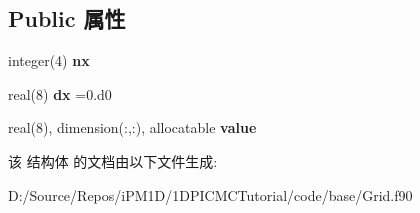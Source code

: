 \subsection*{Public 属性}
\begin{DoxyCompactItemize}
\item 
\mbox{\label{structmodulegrid1d0t_1_1grid1d0t_aedcbb047916c6348dad0da0dc73a71c8}} 
integer(4) {\bfseries nx}
\item 
\mbox{\label{structmodulegrid1d0t_1_1grid1d0t_afe38d5df936e25ef0e44639e59b27f83}} 
real(8) {\bfseries dx} =0.d0
\item 
\mbox{\label{structmodulegrid1d0t_1_1grid1d0t_a9202d32cf655e11ded118061ca47b367}} 
real(8), dimension(\+:,\+:), allocatable {\bfseries value}
\end{DoxyCompactItemize}


该 结构体 的文档由以下文件生成\+:\begin{DoxyCompactItemize}
\item 
D\+:/\+Source/\+Repos/i\+P\+M1\+D/1\+D\+P\+I\+C\+M\+C\+Tutorial/code/base/Grid.\+f90\end{DoxyCompactItemize}

